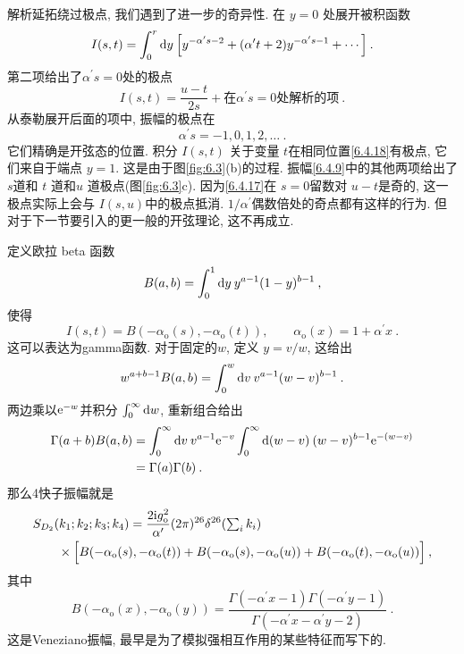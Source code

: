 解析延拓绕过极点, 我们遇到了进一步的奇异性. 在 $y=0$ 处展开被积函数
\begin{equation}
	I(s, t)=\int_{0}^{r} \mathrm{d} y\: \Bigl[y^{-\alpha^{\prime} s-2}+ (\alpha^{\prime} t+2) y^{-\alpha^{\prime} s-1}+\cdots\Bigr] \:. 
	\label{6.4.16}
\end{equation}
第二项给出了$\alpha^{\prime} s=0$处的极点
\begin{equation}
	I(s, t)=\frac{u-t}{2 s}+\text{在$\alpha^{\prime} s=0$处解析的项} \:. \label{6.4.17}
\end{equation}
从泰勒展开后面的项中, 振幅的极点在
\begin{equation}
	\alpha^{\prime} s=-1,0,1,2, \ldots \:. \label{6.4.18}
\end{equation}
它们精确是开弦态的位置. 积分 $I(s, t)$ 关于变量 $t$在相同位置\eqref{6.4.18}有极点, 它们来自于端点 $y=1$.  
这是由于图\ref{fig:6.3}(b)的过程. 振幅\eqref{6.4.9}中的其他两项给出了 $s$道和 $t$ 道和$u$ 道极点(图\ref{fig:6.3}c). 
因为\eqref{6.4.17}在 $s=0$留数对 $u-t$是奇的, 这一极点实际上会与 $I(s, u)$中的极点抵消.  
$1 / \alpha^{\prime}$偶数倍处的奇点都有这样的行为. 但对于下一节要引入的更一般的开弦理论, 这不再成立.

定义欧拉 beta 函数
\begin{equation}
	B(a, b)=\int_{0}^{1} \mathrm{d} y\: y^{a-1}(1-y)^{b-1} \:, \label{6.4.19}
\end{equation}
使得
\begin{equation}
	I(s, t)=B(-\alpha_{\mathrm{o}}(s),-\alpha_{\mathrm{o}}(t)), \qquad \alpha_{\mathrm{o}}(x)=1+\alpha^{\prime} x \:. 
	\label{6.4.20}
\end{equation}
这可以表达为gamma函数. 对于固定的$w$, 定义 $y=v / w$, 这给出 
\begin{equation}
	w^{a+b-1} B(a, b)=\int_{0}^{w} \mathrm{d} v \: v^{a-1}(w-v)^{b-1} \:. \label{6.4.21}
\end{equation}
两边乘以$\mathrm{e}^{-w}$并积分 $\int_{0}^{\infty} \mathrm{d} w$, 重新组合给出
\begin{align}
	\Gamma(a+b) B(a, b) &=\int_{0}^{\infty} \mathrm{d} v\: v^{a-1} \mathrm{e}^{-v} \int_{0}^{\infty} \mathrm{d}(w-v) \: (w-v)^{b-1} \mathrm{e}^{-(w-v)} \nonumber \\
	&=\Gamma(a) \Gamma(b) \:. \label{6.4.22}
\end{align}
那么4快子振幅就是
\begin{align}
	&S_{D_{2}}(k_{1}; k_{2} ; k_{3} ; k_{4})=\frac{2 \mathrm{i} g_{\mathrm{o}}^{2}}{\alpha^{\prime}}
	(2 \pi)^{26} \delta^{26}({\textstyle \sum_{i} k_{i}}) \nonumber \\
	&\qquad \times\Bigl[B(-\alpha_{\mathrm{o}}(s),-\alpha_{\mathrm{o}}(t))+B(-\alpha_{\mathrm{o}}(s),-\alpha_{\mathrm{o}}(u))
	+B(-\alpha_{\mathrm{o}}(t),-\alpha_{\mathrm{o}}(u))\Bigr] \:, \label{6.4.23}
\end{align}
其中
\begin{equation}
	B(-\alpha_{\mathrm{o}}(x),-\alpha_{\mathrm{o}}(y))=
	\frac{\Gamma(-\alpha^{\prime} x-1) \Gamma(-\alpha^{\prime} y-1)}{\Gamma(-\alpha^{\prime} x-\alpha^{\prime} y-2)} \:. \label{6.4.24}
\end{equation}
这是Veneziano振幅, 最早是为了模拟强相互作用的某些特征而写下的.

